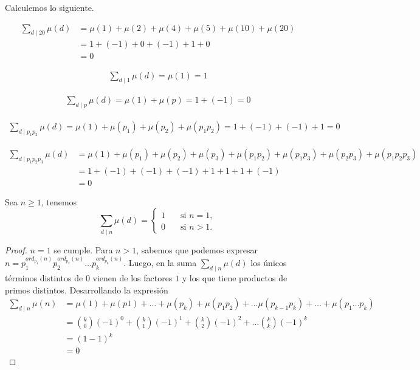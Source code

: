 \documentclass[main.tex]{subfiles}
\begin{document}
\begin{example}
    Calculemos lo siguiente.

    \begin{align*}
        \sum_{d \mid 20} \mu(d) &= \mu(1) + \mu(2) + \mu(4) + \mu(5) + \mu(10) + \mu(20) \\
        &= 1 + (-1) + 0 + (-1) + 1 + 0 \\
        &= 0
    \end{align*}

    \begin{align*}
        \sum_{d \mid 1} \mu(d) = \mu(1) = 1
    \end{align*}

    \begin{align*}
        \sum_{d \mid p} \mu(d) = \mu(1) + \mu(p) = 1 + (-1) = 0
    \end{align*}

    \begin{align*}
        \sum_{d \mid p_1 p_2} \mu(d) = \mu(1) + \mu(p_1) + \mu(p_2) + \mu(p_1 p_2) = 1 + (-1) + (-1) + 1 = 0
    \end{align*}

    \begin{align*}
        \sum_{d \mid p_1 p_2 p_3} \mu(d) &= \mu(1) + \mu(p_1) + \mu(p_2) + \mu(p_3) + \mu(p_1 p_2) + \mu(p_1 p_3) + \mu(p_2 p_3) + \mu(p_1 p_2 p_3) \\
        &= 1 + (-1) + (-1) + (-1) + 1 + 1 + 1 + (-1) \\
        &= 0
    \end{align*}
\end{example}

\begin{theorem}
    Sea $n \geq 1$, tenemos
    \[
    \sum_{d \mid n} \mu(d) =
    \begin{cases}
        1 &\quad \text{si } n = 1, \\
        0 &\quad \text{si } n > 1.
    \end{cases}
    \]
\end{theorem}

\begin{proof}
    $n = 1$ se cumple. Para $n > 1$, sabemos que podemos expresar $n = p_1^{ord_{p_1}(n)} p_2^{ord_{p_2}(n)} \dots p_k^{ord_{p_k}(n)}$. Luego, en la suma $\sum_{d \mid n} \mu(d)$ los \'unicos t\'erminos distintos de $0$ vienen de los factores $1$ y los que tiene productos de primos distintos. Desarrollando la expresi\'on
    \begin{align*}
        \sum_{d \mid n} \mu(n) &= \mu(1) + \mu(p1) + \dots + \mu(p_k) + \mu(p_1 p_2) + \dots \mu(p_{k - 1} p_k) + \dots + \mu(p_1 \dots p_k) \\
        &= \binom{k}{0}(-1)^0 + \binom{k}{1}(-1)^1 + \binom{k}{2}(-1)^2 + \dots \binom{k}{k}(-1)^k \\
        &= (1 - 1)^k \\
        &= 0
    \end{align*}
\end{proof}
\end{document}
